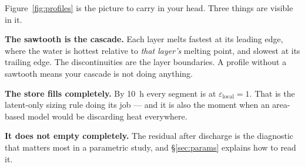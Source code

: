 \documentclass[11pt,a4paper]{article}
\newcommand{\epsloc}{\ensuremath{\varepsilon_{\mathrm{local}}}}
\begin{document}
Figure~\ref{fig:profiles} is the picture to carry in your head. Three things
are visible in it.

\textbf{The sawtooth is the cascade.} Each layer melts fastest at its leading
edge, where the water is hottest relative to \emph{that layer's} melting point,
and slowest at its trailing edge. The discontinuities are the layer boundaries.
A profile without a sawtooth means your cascade is not doing anything.

\textbf{The store fills completely.} By \SI{10}{\hour} every segment is at
$\epsloc=1$. That is the latent-only sizing rule doing its job --- and it is
also the moment when an area-based model would be discarding heat everywhere.

\textbf{It does not empty completely.} The residual after discharge is the
diagnostic that matters most in a parametric study, and \S\ref{sec:params}
explains how to read it.
\end{document}
